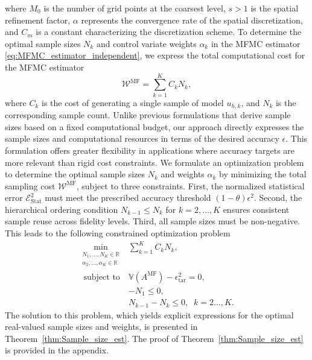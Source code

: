%
where $M_0$ is the number of grid points at the coarsest level, $s>1$ is the spatial refinement factor, $\alpha$ represents the convergence rate of the spatial discretization, and $C_m$ is a constant characterizing the discretization scheme. To determine the optimal sample sizes $N_k$ and control variate weights $\alpha_k$ in the MFMC estimator \eqref{eq:MFMC_estimator_independent}, we express the total computational cost for the MFMC estimator
%
\[
\mathcal{W}^{\text{MF}} = \sum_{k=1}^K C_kN_k,
\]
%
where $C_k$ is the cost of generating a single sample of model $u_{h,k}$, and $N_k$ is the corresponding sample count. Unlike previous formulations \cite{PeWiGu:2016} that derive sample sizes based on a fixed computational budget, our approach directly expresses the sample sizes and computational resources in terms of the desired accuracy $\epsilon$. This formulation offers greater flexibility in applications where accuracy targets are more relevant than rigid cost constraints. We formulate an optimization problem to determine the optimal sample sizes $N_k$ and weights $\alpha_k$ by minimizing the total sampling cost $\mathcal{W}^{\text{MF}}$, subject to three constraints. First, the normalized statistical error $\mathcal{E}_{\text{Stat}}^2$ must meet the prescribed accuracy threshold $(1-\theta)\epsilon^2$. Second,  the hierarchical ordering condition $N_{k-1}\le N_k$ for $k=2,\ldots, K$ ensures consistent sample reuse across fidelity levels. Third, all sample sizes must be non-negative. This leads to the following constrained optimization problem
%
\begin{equation}\label{eq:Optimization_pb_sample_size}
    \begin{array}{ll}
    \min \limits_{\begin{array}{c}\scriptstyle N_1,\ldots, N_K\in \mathbb{R} \\[-4pt]
\scriptstyle \alpha_2,\ldots,\alpha_K\in \mathbb{R}
\end{array}} &\displaystyle\sum\limits_{k=1}^K C_kN_k,\\
       \;\,\text{subject to} &\mathbb{V}\left(A^{\text{MF}}\right)- \epsilon_{\text{tar}}^2 = 0,\\[2pt]
       &\displaystyle -N_1\le 0,\\
        &\displaystyle N_{k-1}-N_k\le 0, \;\; k=2\ldots,K.
    \end{array}
\end{equation}
%
The solution to this problem, which yields explicit expressions for the optimal real-valued sample sizes and weights, is presented in Theorem~\ref{thm:Sample_size_est}. The proof of Theorem~\ref{thm:Sample_size_est} is provided in the appendix.




